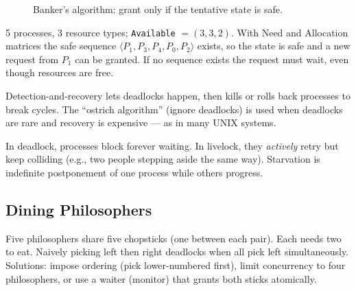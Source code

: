\begin{figure}[h!]
\centering
{}
\caption{Banker's algorithm: grant only if the tentative state is safe.}
\label{fig:banker}
\end{figure}

\begin{example}
5 processes, 3 resource types; \texttt{Available} $=(3,3,2)$. With Need and
Allocation matrices the safe sequence $\langle P_1,P_3,P_4,P_0,P_2\rangle$
exists, so the state is safe and a new request from $P_1$ can be granted.
If no sequence exists the request must wait, even though resources are free.
\end{example}

Detection-and-recovery lets deadlocks happen, then kills or rolls back
processes to break cycles. The ``ostrich algorithm'' (ignore deadlocks) is used
when deadlocks are rare and recovery is expensive --- as in many UNIX systems.

\begin{remark}
In deadlock, processes block forever waiting. In livelock, they \emph{actively}
retry but keep colliding (e.g., two people stepping aside the same way).
Starvation is indefinite postponement of one process while others progress.
\end{remark}

\subsection{Dining Philosophers}
Five philosophers share five chopsticks (one between each pair). Each needs two
to eat. Naively picking left then right deadlocks when all pick left
simultaneously. Solutions: impose ordering (pick lower-numbered first), limit
concurrency to four philosophers, or use a waiter (monitor) that grants both
sticks atomically.

